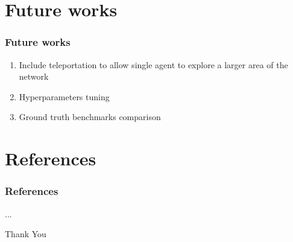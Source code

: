 \documentclass{beamer}
\begin{document}
\section{Future works}
\begin{frame}
\frametitle{Future works}
\begin{enumerate}
	\item Include teleportation to allow single agent to explore a larger area of the network
	\item Hyperparameters tuning
	\item Ground truth benchmarks comparison
\end{enumerate}
\end{frame}

\section*{References}
\begin{frame}
\frametitle{References}
...
\end{frame}

\begin{frame}
	\Huge{\centerline{Thank You}}
\end{frame}
\end{document}

